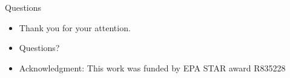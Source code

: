 \documentclass{beamer}
\begin{document}
\begin{frame}{Questions}
	\begin{itemize} \setlength{\itemsep}{1em}
		\item Thank you for your attention.
    \item Questions?
		\item Acknowledgment: This work was funded by EPA STAR award R835228
	\end{itemize}
\end{frame}
%
\end{document}
